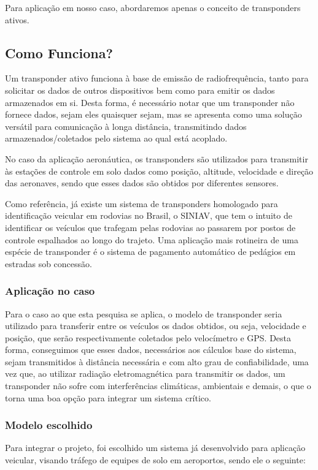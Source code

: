 Para aplicação em nosso caso, abordaremos apenas o conceito de transponders ativos.

\subsection{Como Funciona?}
Um transponder ativo funciona à base de emissão de radiofrequência, tanto para
solicitar os dados de outros dispositivos bem como para emitir os dados
armazenados em si. Desta forma, é necessário notar que um transponder não
fornece dados, sejam eles quaisquer sejam, mas se apresenta como uma solução
versátil para comunicação à longa distância, transmitindo dados
armazenados/coletados pelo sistema ao qual está acoplado.

No caso da aplicação aeronáutica, os transponders são utilizados para
transmitir às estações de controle em solo dados como posição, altitude,
velocidade e direção das aeronaves, sendo que esses dados são obtidos
por diferentes sensores.

Como referência, já existe um sistema de transponders homologado
para identificação veicular em rodovias no Brasil, o SINIAV, que
tem o intuito de identificar os veículos que trafegam pelas
rodovias ao passarem por postos de controle espalhados ao longo do
trajeto. Uma aplicação mais rotineira de uma espécie de transponder
é o sistema de pagamento automático de pedágios em estradas sob concessão.

\subsubsection{Aplicação no caso}
Para o caso ao que esta pesquisa se aplica, o modelo de transponder seria
utilizado para transferir entre os veículos os dados obtidos, ou seja,
velocidade e posição, que serão respectivamente coletados pelo velocímetro
e GPS. Desta forma, conseguimos que esses dados, necessários aos cálculos
base do sistema, sejam transmitidos à distância necessária e com alto grau
de confiabilidade, uma vez que, ao utilizar radiação eletromagnética para
transmitir os dados, um transponder não sofre com interferências climáticas,
ambientais e demais, o que o torna uma boa opção para integrar um sistema crítico.

\subsubsection{Modelo escolhido}
Para integrar o projeto, foi escolhido um sistema já desenvolvido para aplicação
veicular, visando tráfego de equipes de solo em aeroportos, sendo ele o seguinte:

